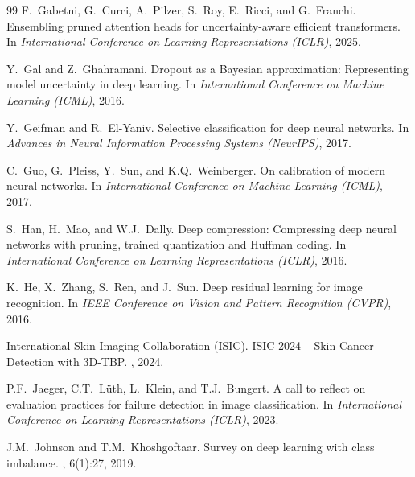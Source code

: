\documentclass[letterpaper]{article} %
\begin{document}
\begin{thebibliography}{99}
F.~Gabetni, G.~Curci, A.~Pilzer, S.~Roy, E.~Ricci, and G.~Franchi.
\newblock Ensembling pruned attention heads for uncertainty-aware efficient transformers.
\newblock In {\em International Conference on Learning Representations (ICLR)}, 2025.

Y.~Gal and Z.~Ghahramani.
\newblock Dropout as a Bayesian approximation: Representing model uncertainty in deep learning.
\newblock In {\em International Conference on Machine Learning (ICML)}, 2016.

Y.~Geifman and R.~El-Yaniv.
\newblock Selective classification for deep neural networks.
\newblock In {\em Advances in Neural Information Processing Systems (NeurIPS)}, 2017.

C.~Guo, G.~Pleiss, Y.~Sun, and K.Q.~Weinberger.
\newblock On calibration of modern neural networks.
\newblock In {\em International Conference on Machine Learning (ICML)}, 2017.

S.~Han, H.~Mao, and W.J.~Dally.
\newblock Deep compression: Compressing deep neural networks with pruning, trained quantization and Huffman coding.
\newblock In {\em International Conference on Learning Representations (ICLR)}, 2016.

K.~He, X.~Zhang, S.~Ren, and J.~Sun.
\newblock Deep residual learning for image recognition.
\newblock In {\em IEEE Conference on Vision and Pattern Recognition (CVPR)}, 2016.

International Skin Imaging Collaboration (ISIC).
\newblock ISIC 2024 -- Skin Cancer Detection with 3D-TBP.
, 2024.

P.F.~Jaeger, C.T.~L\"uth, L.~Klein, and T.J.~Bungert.
\newblock A call to reflect on evaluation practices for failure detection in image classification.
\newblock In {\em International Conference on Learning Representations (ICLR)}, 2023.

J.M.~Johnson and T.M.~Khoshgoftaar.
\newblock Survey on deep learning with class imbalance.
, 6(1):27, 2019.


\end{thebibliography}
\end{document}
